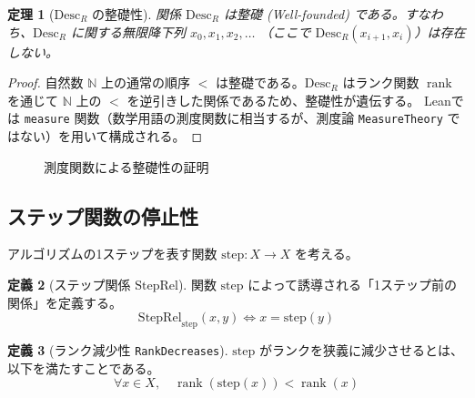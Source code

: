 \documentclass[a4paper,11pt]{article}
\theoremstyle{definition}
\newtheorem{definition}{定義}[section]
\theoremstyle{plain}
\newtheorem{theorem}[definition]{定理}
\newcommand{\code}[1]{\texttt{#1}}
\newcommand{\rank}{\operatorname{rank}}
\newcommand{\Desc}{\mathrm{Desc}}
\newcommand{\StepRel}{\mathrm{StepRel}}
\newcommand{\step}{\mathrm{step}}
\newcommand{\N}{\mathbb{N}}
\begin{document}
\begin{theorem}[$\Desc_R$ の整礎性]
関係 $\Desc_R$ は整礎 (Well-founded) である。すなわち、$\Desc_R$ に関する無限降下列 $x_0, x_1, x_2, \dots$ （ここで $\Desc_R(x_{i+1}, x_i)$）は存在しない。
\end{theorem}

\begin{proof}
自然数 $\N$ 上の通常の順序 $<$ は整礎である。$\Desc_R$ はランク関数 $\rank$ を通じて $\N$ 上の $<$ を逆引きした関係であるため、整礎性が遺伝する。
Leanでは \code{measure} 関数（数学用語の測度関数に相当するが、測度論 \code{MeasureTheory} ではない）を用いて構成される。
\end{proof}

\begin{figure}[h]
\centering
{}
\caption{測度関数による整礎性の証明}
\end{figure}

\subsection{ステップ関数の停止性}

アルゴリズムの1ステップを表す関数 $\step: X \to X$ を考える。

\begin{definition}[ステップ関係 $\StepRel$]
関数 $\step$ によって誘導される「1ステップ前の関係」を定義する。
\[ \StepRel_{\step}(x, y) \iff x = \step(y) \]
\end{definition}

\begin{definition}[ランク減少性 \code{RankDecreases}]
$\step$ がランクを狭義に減少させるとは、以下を満たすことである。
\[ \forall x \in X,\quad \rank(\step(x)) < \rank(x) \]
\end{definition}
\end{document}
